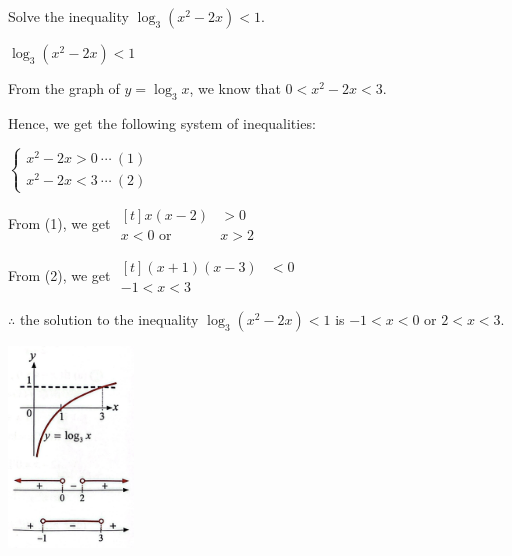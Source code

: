\documentclass{report}
\begin{document}
			\begin{question}
				Solve the inequality $\log _3\left(x^2-2 x\right)<1$.
				
				\sol{}
				\vspace{-1em}
				\begin{multicols}{2}
					\noindent $\log _3\left(x^2-2 x\right)<1$
					            
					\noindent From the graph of $y = \log_3 x$, we know that $0 < x^2-2 x < 3$.
					
					\noindent Hence, we get the following system of inequalities:
					            
					\noindent $\left\{\begin{array}{l}
					x^2-2 x>0\ \cdots\ (1) \\
					x^2-2 x<3\ \cdots\ (2)
					\end{array}\right.$
					
					\noindent From (1), we get $\begin{aligned}[t]
					x(x-2)&>0 \\
					x<0 \text { or } &x>2
					\end{aligned}$
					
					\noindent From (2), we get $\begin{aligned}[t]
					(x+1)(x-3)&<0 \\
					-1<x<3
					\end{aligned}$
					
					\noindent $\therefore$ the solution to the inequality $\log _3\left(x^2-2 x\right)<1$ is $-1<x<0$ or $2<x<3$.
					
					\columnbreak
					
					\vspace*{3em}
					
					\begin{center}
						\includegraphics[width=0.25\textwidth]{assets/12-9.png}
					\end{center}
				\end{multicols}
			\end{question}
			
\end{document}

